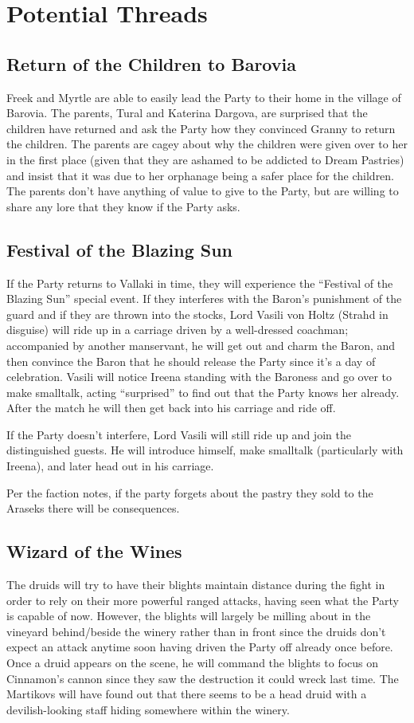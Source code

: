 \documentclass[a4paper,11pt]{article}
\begin{document}
\section{Potential Threads}
\label{sec:PotentialThreads}
\subsection{Return of the Children to Barovia}
Freek and Myrtle are able to easily lead the Party to their home in the village of Barovia. The parents, Tural 
and Katerina Dargova, are surprised that the children have returned and ask the Party how they convinced Granny 
to return the children. The parents are cagey about why the children were given over to her in the first place 
(given that they are ashamed to be addicted to Dream Pastries) and insist that it was due to her orphanage being 
a safer place for the children. The parents don't have anything of value to give to the Party, but are willing to 
share any lore that they know if the Party asks.

\subsection{Festival of the Blazing Sun}
If the Party returns to Vallaki in time, they will experience the ``Festival of the Blazing Sun'' special event.
If they interferes with the Baron's punishment of the guard and if they are thrown into the stocks, Lord
Vasili von Holtz (Strahd in disguise) will ride up in a carriage driven by a well-dressed coachman; accompanied 
by another manservant, he will get out and charm the Baron, and then convince the Baron that he should release 
the Party since it's a day of celebration. Vasili will notice Ireena standing with the Baroness and go over to 
make smalltalk, acting ``surprised'' to find out that the Party knows her already. After the match he will then 
get back into his carriage and ride off.

If the Party doesn't interfere, Lord Vasili will still ride up and join the distinguished guests. He will introduce himself, make smalltalk (particularly with Ireena), and later head out in his carriage.

Per the faction notes, if the party forgets about the pastry they sold to the Araseks there will be consequences.

\subsection{Wizard of the Wines}
The druids will try to have their blights maintain distance during the fight in order to rely on their more 
powerful ranged attacks, having seen what the Party is capable of now. However, the blights will largely be 
milling about in the vineyard behind/beside the winery rather than in front since the druids don't expect an 
attack anytime soon having driven the Party off already once before. Once a druid appears on the scene, he will 
command the blights to focus on Cinnamon's cannon since they saw the destruction it could wreck last time. The 
Martikovs will have found out that there seems to be a head druid with a devilish-looking staff hiding somewhere
within the winery.
\end{document}
